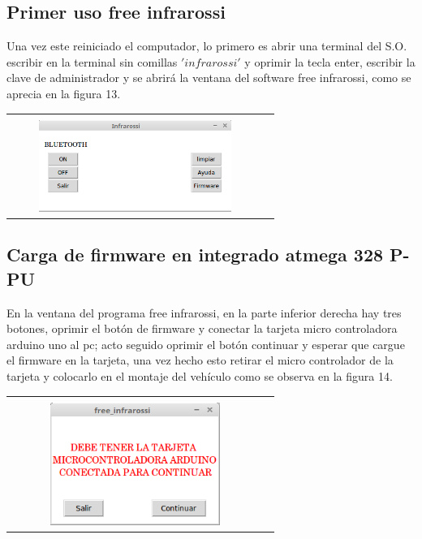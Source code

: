 \documentclass[12]{article}
\newenvironment{Figure}
{\par\medskip\noindent\minipage{\linewidth}}
{\endminipage\par\medskip}
\begin{document}
\begin{multicols}{2}
\subsection{Primer uso free infrarossi}
Una vez este reiniciado el computador, lo primero  es abrir una terminal del S.O. escribir en la terminal sin comillas $'infrarossi'$ y oprimir la tecla enter, escribir la clave de administrador y se abrirá la ventana del software free infrarossi, como se aprecia en la figura 13.
\begin{Figure}	
\center
\begin{tabular}{|l|r|}
\hline \\
\includegraphics[width=8cm, height=3cm]{img/infrarossi.png} \\ \hline
\end{tabular}
\label{fig:g13}
\end{Figure}
\subsection{Carga de firmware en integrado atmega 328 P-PU}
En la ventana del programa free infrarossi, en la parte inferior derecha hay tres botones, oprimir el botón de firmware y conectar la tarjeta micro controladora arduino uno al pc; acto seguido oprimir el botón continuar y esperar que cargue el firmware en la tarjeta, una vez hecho esto retirar el micro controlador de la tarjeta y colocarlo en el montaje del vehículo como se observa en la figura 14.
\begin{Figure}	
\center
\begin{tabular}{|l|r|}
\hline\\
\includegraphics[width=8cm, height=4cm]{img/firmware.png} \\ \hline
\end{tabular}
\label{fig:g14}
\end{Figure}

\end{multicols}
\end{document}
